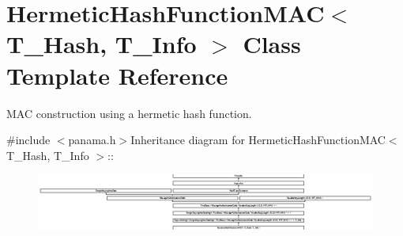 \hypertarget{class_hermetic_hash_function_m_a_c}{
\section{HermeticHashFunctionMAC$<$ T\_\-Hash, T\_\-Info $>$ Class Template Reference}
\label{class_hermetic_hash_function_m_a_c}
}


MAC construction using a hermetic hash function.  


{\ttfamily \#include $<$panama.h$>$}Inheritance diagram for HermeticHashFunctionMAC$<$ T\_\-Hash, T\_\-Info $>$::\begin{figure}[H]
\begin{center}
\leavevmode
\includegraphics[height=1.83908cm]{class_hermetic_hash_function_m_a_c}
\end{center}
\end{figure}
